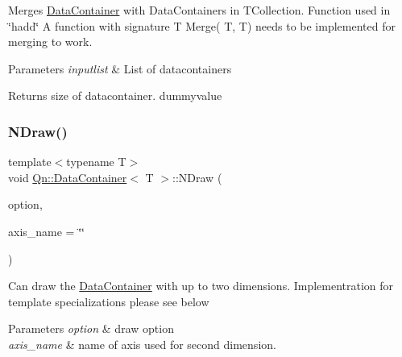 Merges \mbox{\hyperlink{classQn_1_1DataContainer}{Data\+Container}} with Data\+Containers in T\+Collection. Function used in \char`\"{}hadd\char`\"{} A function with signature T Merge( T, T) needs to be implemented for merging to work. 
\begin{DoxyParams}{Parameters}
{\em inputlist} & List of datacontainers \\
\hline
\end{DoxyParams}
\begin{DoxyReturn}{Returns}
size of datacontainer. dummyvalue 
\end{DoxyReturn}
\mbox{\label{classQn_1_1DataContainer_a146d918368c9ab5273e223fac3bcedf1}} 
\subsubsection{\texorpdfstring{N\+Draw()}{NDraw()}}
{\footnotesize\ttfamily template$<$typename T$>$ \\
void \mbox{\hyperlink{classQn_1_1DataContainer}{Qn\+::\+Data\+Container}}$<$ T $>$\+::N\+Draw (\begin{DoxyParamCaption}\item[{Option\+\_\+t $\ast$}]{option,  }\item[{const std\+::string \&}]{axis\+\_\+name = {\ttfamily \char`\"{}\char`\"{}} }\end{DoxyParamCaption})\hspace{0.3cm}{\ttfamily [inline]}}

Can draw the \mbox{\hyperlink{classQn_1_1DataContainer}{Data\+Container}} with up to two dimensions. Implementration for template specializations please see below 
\begin{DoxyParams}{Parameters}
{\em option} & draw option \\
\hline
{\em axis\+\_\+name} & name of axis used for second dimension. \\
\hline
\end{DoxyParams}
\mbox{\label{classQn_1_1DataContainer_ac20e9292be55e0241647f356c1d7bb4e}} 
